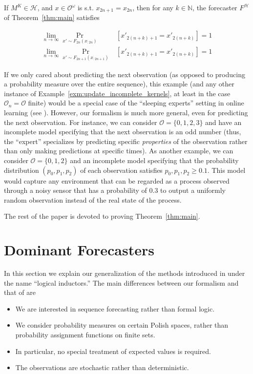\documentclass[aop,preprint]{imsart}
\numberwithin{equation}{section}
\theoremstyle{definition}
\theoremstyle{plain}
\newcommand{\Nats}{\mathbb{N}}
\newcommand{\Ob}{\mathcal{O}}
\newcommand{\OO}{\Ob^\omega}
\newcommand{\MC}{\mathcal{H}}
\begin{document}
If $M^K \in \MC$, and $x\in\OO$ is s.t. $x_{2n+1}=x_{2n}$, then for any $k \in \Nats$, the forecaster $F^\MC$ of Theorem~\ref{thm:main} satisfies

\begin{align}
\lim_{n\rightarrow\infty} \Pr_{x' \sim F_{2n}\left(x_{:2n}\right)}&\left[x'_{2(n+k)+1}=x'_{2(n+k)}\right] = 1\\
\lim_{n\rightarrow\infty} \Pr_{x' \sim F_{2n+1}\left(x_{:2n+1}\right)}&\left[x'_{2(n+k)+1}=x'_{2(n+k)}\right] = 1
\end{align}

If we only cared about predicting the next observation (as opposed to producing a probability measure over the entire sequence), this example (and any other instance of Example~\ref{exm:update_incomplete_kernels}, at least in the case $\Ob_n=\Ob$ finite) would be a special case of the \enquote{sleeping experts} setting in online learning (see \cite{Freund_1997}). However, our formalism is much more general, even for predicting the next observation. For instance, we can consider $\Ob=\{0,1,2,3\}$ and have an incomplete model specifying that the next observation is an odd number (thus, the \enquote{expert} specializes by predicting specific \emph{properties} of the observation rather than only making predictions at specific times). As another example, we can consider $\Ob=\{0,1,2\}$ and an incomplete model specifying that the probability distribution $\left(p_0,p_1,p_2\right)$ of each observation satisfies $p_0,p_1,p_2 \geq 0.1$. This model would capture any environment that can be regarded as a process observed through a noisy sensor that has a probability of 0.3 to output a uniformly random observation instead of the real state of the process.

The rest of the paper is devoted to proving Theorem~\ref{thm:main}.

\section{Dominant Forecasters}
\label{sec:garrabrant}

In this section we explain our generalization of the methods introduced in \cite{Garrabrant_2016} under the name \enquote{logical inductors.} The main differences between our formalism and that of \cite{Garrabrant_2016} are

\begin{itemize}
\item 
We are interested in sequence forecasting rather than formal logic.
\item
We consider probability measures on certain Polish spaces, rather than probability assignment functions on finite sets.
\item
In particular, no special treatment of expected values is required.
\item
The observations are stochastic rather than deterministic.
\end{itemize}
\end{document}
